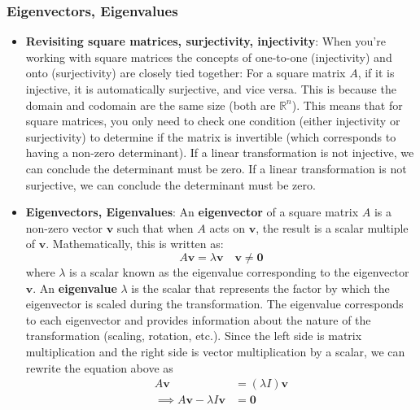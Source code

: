 \documentclass{report}
\begin{document}
    \subsubsection{Eigenvectors, Eigenvalues}
    \begin{itemize}
        \item \textbf{Revisiting square matrices, surjectivity, injectivity}: When you're working with square matrices the concepts of one-to-one (injectivity) and onto (surjectivity) are closely tied together:
            \bigbreak \noindent 
            For a square matrix $A$, if it is injective, it is automatically surjective, and vice versa. This is because the domain and codomain are the same size (both are $\mathbb{R}^{n}$).
            \bigbreak \noindent 
            This means that for square matrices, you only need to check one condition (either injectivity or surjectivity) to determine if the matrix is invertible (which corresponds to having a non-zero determinant).
            \bigbreak \noindent 
            If a linear transformation is not injective, we can conclude the determinant must be zero.
            \bigbreak \noindent 
            If a linear transformation is not surjective, we can conclude the determinant must be zero.
        \item \textbf{Eigenvectors, Eigenvalues}:
            An \textbf{eigenvector} of a square matrix \( A \) is a non-zero vector \( \mathbf{v} \) such that when \( A \) acts on \( \mathbf{v} \), the result is a scalar multiple of \( \mathbf{v} \). Mathematically, this is written as:
            \[
                A \mathbf{v} = \lambda \mathbf{v} \quad \mathbf{v} \ne \mathbf{0}
            \]
            where \( \lambda \) is a scalar known as the eigenvalue corresponding to the eigenvector \( \mathbf{v} \).
            \bigbreak \noindent 
            An \textbf{eigenvalue} \( \lambda \) is the scalar that represents the factor by which the eigenvector is scaled during the transformation. The eigenvalue corresponds to each eigenvector and provides information about the nature of the transformation (scaling, rotation, etc.).
            \bigbreak \noindent 
            Since the left side is matrix multiplication and the right side is vector multiplication by a scalar, we can rewrite the equation above as
            \begin{align*}
                A\mathbf{v} &= (\lambda I)\mathbf{v} \\
                \implies A\mathbf{v} - \lambda I \mathbf{v} &= \mathbf{0} \\

\end{align*}
\end{itemize}
\end{document}
